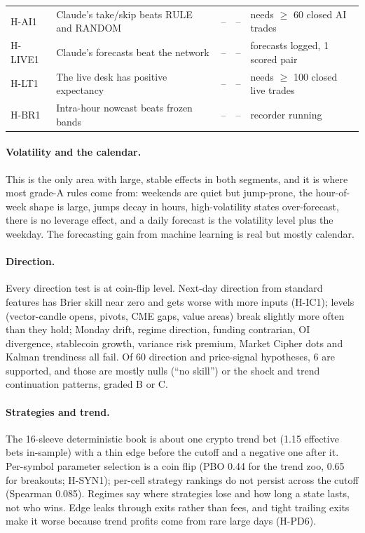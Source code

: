 \documentclass[10pt,a4paper]{article}
\newcommand{\hyp}[1]{\textsf{#1}}
\begin{document}
{\begin{longtable}{@{}>{\raggedright\arraybackslash}p{1.55cm}>{\raggedright\arraybackslash}p{6.1cm}cc>{\raggedright\arraybackslash}p{5.3cm}@{}}
H-AI1 & Claude's take/skip beats RULE and RANDOM & -- & -- & needs $\ge$ 60 closed AI trades \\
H-LIVE1 & Claude's forecasts beat the network & -- & -- & 60 forecasts logged, 1 scored pair \\
H-LT1 & The live desk has positive expectancy & -- & -- & needs $\ge$ 100 closed live trades \\
H-BR1 & Intra-hour nowcast beats frozen bands & -- & -- & recorder running \\
\bottomrule
\end{longtable}
}

\paragraph{Volatility and the calendar.} This is the only area with large, stable effects in both segments, and it is where most grade-A rules come from: weekends are quiet but jump-prone, the hour-of-week shape is large, jumps decay in hours, high-volatility states over-forecast, there is no leverage effect, and a daily forecast is the volatility level plus the weekday. The forecasting gain from machine learning is real but mostly calendar.

\paragraph{Direction.} Every direction test is at coin-flip level. Next-day direction from standard features has Brier skill near zero and gets worse with more inputs (\hyp{H-IC1}); levels (vector-candle opens, pivots, CME gaps, value areas) break slightly more often than they hold; Monday drift, regime direction, funding contrarian, OI divergence, stablecoin growth, variance risk premium, Market Cipher dots and Kalman trendiness all fail. Of 60 direction and price-signal hypotheses, 6 are supported, and those are mostly nulls (``no skill'') or the shock and trend continuation patterns, graded B or C.

\paragraph{Strategies and trend.} The 16-sleeve deterministic book is about one crypto trend bet (1.15 effective bets in-sample) with a thin edge before the cutoff and a negative one after it. Per-symbol parameter selection is a coin flip (PBO 0.44 for the trend zoo, 0.65 for breakouts; \hyp{H-SYN1}); per-cell strategy rankings do not persist across the cutoff (Spearman 0.085). Regimes say where strategies lose and how long a state lasts, not who wins. Edge leaks through exits rather than fees, and tight trailing exits make it worse because trend profits come from rare large days (\hyp{H-PD6}).
\end{document}
